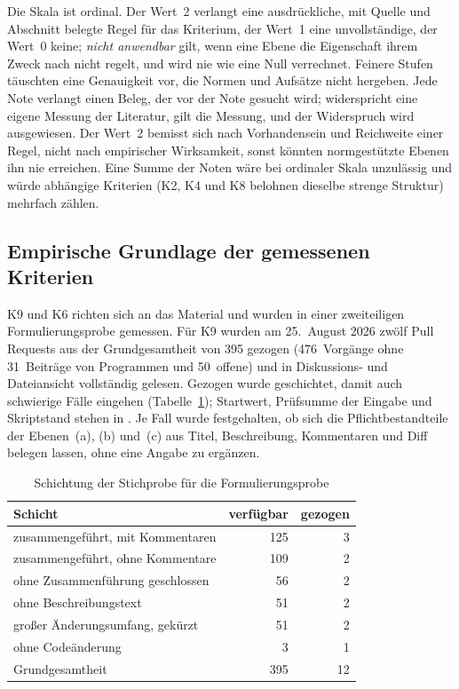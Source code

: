 \documentclass[11pt,a4paper]{report}
\begin{document}
Die Skala ist ordinal. Der Wert~2 verlangt eine ausdrückliche, mit
Quelle und Abschnitt belegte Regel für das Kriterium, der Wert~1 eine
unvollständige, der Wert~0 keine; \emph{nicht anwendbar} gilt, wenn eine
Ebene die Eigenschaft ihrem Zweck nach nicht regelt, und wird nie wie
eine Null verrechnet. Feinere Stufen täuschten eine Genauigkeit vor, die
Normen und Aufsätze nicht hergeben. Jede Note verlangt einen Beleg, der
vor der Note gesucht wird; widerspricht eine eigene Messung der
Literatur, gilt die Messung, und der Widerspruch wird ausgewiesen. Der
Wert~2 bemisst sich nach Vorhandensein und Reichweite einer Regel, nicht
nach empirischer Wirksamkeit, sonst könnten normgestützte Ebenen ihn nie
erreichen. Eine Summe der Noten wäre bei ordinaler Skala unzulässig und
würde abhängige Kriterien (K2, K4 und K8 belohnen dieselbe strenge
Struktur) mehrfach zählen.

\subsection{Empirische Grundlage der gemessenen Kriterien}
\label{subsec:formulierungsprobe}

K9 und K6 richten sich an das Material und wurden in einer
zweiteiligen Formulierungsprobe gemessen. Für K9 wurden am
25.~August 2026 zwölf Pull Requests aus der Grundgesamtheit von 395
gezogen (476~Vorgänge ohne 31~Beiträge von Programmen und 50~offene) und
in Diskussions- und Dateiansicht vollständig gelesen. Gezogen wurde
geschichtet, damit auch schwierige Fälle eingehen
(Tabelle~\ref{tab:schichtung}); Startwert, Prüfsumme der Eingabe und
Skriptstand stehen in . Je Fall
wurde festgehalten, ob sich die Pflichtbestandteile der Ebenen~(a),
(b) und~(c) aus Titel, Beschreibung, Kommentaren und Diff belegen lassen,
ohne eine Angabe zu ergänzen.

\begin{table}[htbp]
  \centering
  \caption{Schichtung der Stichprobe für die Formulierungsprobe}
  \label{tab:schichtung}
  \begin{tabular}{@{}>{\raggedright\arraybackslash}p{7.4cm}rr@{}}
    \toprule
    \textbf{Schicht} & \textbf{verfügbar} & \textbf{gezogen} \\
    \midrule
    zusammengeführt, mit Kommentaren      & 125 & 3 \\
    zusammengeführt, ohne Kommentare      & 109 & 2 \\
    ohne Zusammenführung geschlossen      &  56 & 2 \\
    ohne Beschreibungstext                &  51 & 2 \\
    großer Änderungsumfang, gekürzt       &  51 & 2 \\
    ohne Codeänderung                     &   3 & 1 \\
    \midrule
    Grundgesamtheit                       & 395 & 12 \\
    \bottomrule
  \end{tabular}
\end{table}
\end{document}

